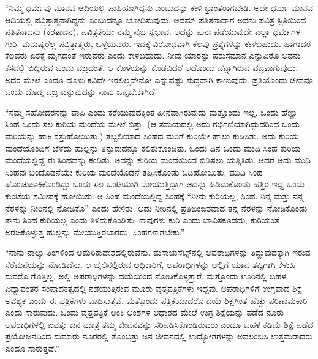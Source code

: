 “ನಿಮ್ಮ ಧರ್ಮವು ಮಾನವ ಆದಿಯಲ್ಲಿ ಪಾಪಿಯಾಗಿದ್ದನು ಎಂಬುದನ್ನು ಕೇಳಿ ಭ್ರಾಂತರಾಗಬೇಡಿ. ಅದೇ ಧರ್ಮ ಮಾನವ ಆದಿಯಲ್ಲಿ ಪವಿತ್ರಾತ್ಮನಾಗಿದ್ದನು ಎಂಬುದನ್ನೂ ಬೋಧಿಸುವುದು. ಆದಮ್​ ಪತಿತನಾದಾಗ ಅವನು ಪವಿತ್ರ ಸ್ಥಿತಿಯಿಂದ ಪತಿತನಾದನು (ಕರತಾಡನ). ಪವಿತ್ರತೆಯೇ ನಮ್ಮ ನೈಜ ಸ್ವಭಾವ. ಅದನ್ನು ಪುನಃ ಪಡೆಯುವುದೇ ಎಲ್ಲಾ ಧರ್ಮಗಳ ಗುರಿ. ಮನುಷ್ಯರೆಲ್ಲ ಪವಿತ್ರಾತ್ಮರು, ಒಳ್ಳೆಯವರು. ಇದಕ್ಕೆ ವಿರೋಧವಾಗಿ ಕೆಲವು ಪ್ರಶ್ನೆಗಳನ್ನು ಕೇಳಬಹುದು. ಹಾಗಾದರೆ ಕೆಲವರು ಏತಕ್ಕೆ ಮೃಗದಂತೆ ಇರುವರು ಎಂದು ಕೇಳಬಹುದು. ನೀವು ಯಾರನ್ನು ಪಶುಸಮಾನ ಎನ್ನುವಿರೊ ಅವನು ಕಸದಲ್ಲಿ ಬಿದ್ದಿರುವ ಒಂದು ವಜ್ರದಂತೆ. ಆ ಕೊಳೆಯನ್ನು ಕೊಡವಿದರೆ ಅದೊಂದು ಚೆನ್ನಾಗಿರುವ ವಜ್ರವಾಗುವುದು. ಅದರ ಮೇಲೆ ಎಂದೂ ಧೂಳು ಕವಿದೇ ಇರಲಿಲ್ಲವೇನೋ ಎನ್ನುವಷ್ಟು ಶುದ್ಧವಾಗಿ ಕಾಣುವುದು. ಪ್ರತಿಯೊಂದು ಜೀವವೂ ಒಂದು ದೊಡ್ಡ ವಜ್ರ ಎನ್ನುವುದನ್ನು ನಾವು ಒಪ್ಪಬೇಕಾಗಿದೆ.”

“ನಮ್ಮ ಸಹೋದರನನ್ನು ಪಾಪಿ ಎಂದು ಕರೆಯುವುದಕ್ಕಿಂತ ಹೀನವಾಗಿರುವುದು ಮತ್ತೊಂದು ಇಲ್ಲ. ಒಂದು ಹೆಣ್ಣು ಸಿಂಹ ಒಂದು ಸಲ ಕುರಿಯ ಮಂದೆಯ ಮೇಲೆ ಬಿತ್ತು. (ಆ ಸಮಯದಲ್ಲಿ ಅದು ಗರ್ಭಿಣಿಯಾಗಿದ್ದುದರಿಂದ ಒಂದು ಮರಿಯನ್ನು ಹಾಕಿ ಸತ್ತುಹೋಯಿತು.) ತಬ್ಬಲಿಯಾದ ಸಿಂಹದ ಮರಿಗೆ ಕುರಿಯೇ ಹಾಲು ಕುಡಿಸಿತು. ಅದು ಕುರಿಯ ಮಂದೆಯೊಂದಿಗೆ ಬೆಳೆದು ಹುಲ್ಲನ್ನು ತಿನ್ನುವುದನ್ನೂ ಕಲಿತುಕೊಂಡಿತು. ಒಂದು ದಿನ ಒಂದು ಮುದಿ ಸಿಂಹ ಕುರಿಯ ಮಂದೆಯಲ್ಲಿದ್ದ ಈ ಸಿಂಹವನ್ನು ಕಂಡಿತು. ಅದನ್ನು ಕುರಿಯ ಮಂದೆಯಿಂದ ಬಿಡಿಸಲು ಯತ್ನಿಸಿತು. ಆದರೆ ಅದು ಮುದಿ ಸಿಂಹವು ಬಂದೊಡನೆಯೇ ಕುರಿಯ ಮಂದೆಯೊಡನೆ ತಪ್ಪಿಸಿಕೊಂಡು ಓಡಿಹೋಯಿತು. ಮುದಿ ಸಿಂಹ ಹೊಂಚುಹಾಕಿಕೊಂಡಿದ್ದು ಒಂದು ಸಲ ಒಂಟಿಯಾಗಿ ಮೇಯುತ್ತಿದ್ದಾಗ ಅದನ್ನು ಹಿಡಿದುಕೊಂಡು ಹತ್ತಿರ ಇದ್ದ ಒಂದು ಕುಂಟೆಯ ಸಮೀಪಕ್ಕೆ ಹೋಯಿಸು. ಆ ಸಿಂಹ ಮಂದೆಯಲ್ಲಿದ್ದ ಸಿಂಹಕ್ಕೆ “ನೀನು ಕುರಿಯಲ್ಲ, ಸಿಂಹ. ನಿನ್ನ ಮತ್ತು ನನ್ನ ನೆರಳನ್ನು ನೀರಿನಲ್ಲಿ ನೋಡಿಕೊ” ಎಂದು ಹೇಳಿತು. ಅದು ನೀರಿನಲ್ಲಿ ಪ್ರತಿಬಿಂಬಿತವಾದ ತನ್ನ ನೆರಳನ್ನು ನೋಡಿಕೊಂಡು ತಾನು ಸಿಂಹ ಕುರಿಯಲ್ಲ ಎಂದು ತಿಳಿದುಕೊಂಡಿತು. ನಾವುಗಳು ಕುರಿ ಎಂದು ಭಾವಿಸಕೂಡದು, ಕುರಿಯಂತೆ ಅರಚಿಕೊಳ್ಳುತ್ತ ಹುಲ್ಲನ್ನು ಮೇಯುತ್ತಿರಬಾರದು, ಸಿಂಹಗಳಾಗಬೇಕು.”

“ನಾನು ನಾಲ್ಕು ತಿಂಗಳಿಂದ ಅಮೆರಿಕಾದೇಶದಲ್ಲಿರುವೆನು. ಮಸಾಚುಸೆಟ್ಸ್​ನಲ್ಲಿ ಅಪರಾಧಿಗಳನ್ನು ತಿದ್ದುವುದಕ್ಕಾಗಿ ಇರುವ ಸೆರೆಮನೆಯನ್ನು ನೋಡಿದೆನು. ಆ ಜೈಲಿನಲ್ಲಿರುವ ಅಧಿಕಾರಿಗೆ, ಅಪರಾಧಿಗಳನ್ನು ಅಲ್ಲಿಗೆ ಯಾವ ತಪ್ಪಿಗಾಗಿ ಕಳುಹಿ ಸುವರೊ ಗೊತ್ತಿಲ್ಲ. ಅಲ್ಲಿ ಅಪರಾಧಿಗಳನ್ನು ದಯೆಯಿಂದ ನೋಡಿಕೊಳ್ಳತ್ತಾರೆ. ಮತ್ತೊಂದು ಊರಿನಲ್ಲಿ ಬಹಳ ವಿದ್ಯಾವಂತರ ಸಂಪಾದಕತ್ವದಲ್ಲಿ ನಡೆಯುತ್ತಿರುವ ಮೂರು ವೃತ್ತಪತ್ರಿಕೆಗಳು ಇದ್ದವು. ಅಪರಾಧಿಗಳಿಗೆ ಉಗ್ರವಾದ ಶಿಕ್ಷೆ ಅವಶ್ಯಕ ಎಂದು ಈ ಪತ್ರಿಕೆಗಳು ವಾದಿಸುತ್ತವೆ. ಮತ್ತೊಂದು ಪತ್ರಿಕೆಯಾದರೊ ದಯೆ ಶಿಕ್ಷೆಗಿಂತ ಹೆಚ್ಚು ಪರಿಣಾಮಕಾರಿ ಎಂದು ಸಾರುವುದು. ಒಂದು ವೃತ್ತಪತ್ರಿಕೆ ಅಂಕಿ ಅಂಶಗಳ ಆಧಾರದ ಮೇಲೆ ಉಗ್ರ ಶಿಕ್ಷೆಯನ್ನು ಪಡೆದ ನೂರು ಅಪರಾಧಿಗಳಲ್ಲಿ ಐವತ್ತು ಜನ ಮಾತ್ರ ತಮ್ಮ ಜೀವನವನ್ನು ಸರಿಪಡಿಸಿಕೊಂಡಿರುವರು ಎಂದೂ ಬಹಳ ಕಡಿಮೆ ಶಿಕ್ಷೆ ಪಡೆದ ಪ್ರಯೋಜನದಿಂದ ಸುಮಾರು ನೂರರಲ್ಲಿ ತೊಂಬತ್ತು ಜನ ಜೀವನದಲ್ಲಿ ಉದ್ಯೋಗಗಳನ್ನು ಅವಲಂಬಿಸಿ ಉತ್ತಮರಾದರು ಎಂದೂ ಸಾರುತ್ತದೆ.”

